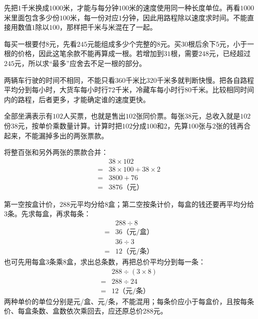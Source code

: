 \documentclass[multi=snippet,border=0pt]{standalone}
\newenvironment{snippet}[3]{\begin{minipage}{#1bp}\color{answerred}\fontsize{#2}{#3}\selectfont\raggedright}{\end{minipage}}
\begin{document}
\begin{snippet}{505}{11.5}{14}先把\(1\)千米换成\(1000\)米，才能与每分钟\(100\)米的速度使用同一种长度单位。再看\(1000\)米里面包含多少份\(100\)米，每一份对应\(1\)分钟，因此用路程除以速度求时间。不能直接用数值\(1\)除以\(100\)，那样把千米与米混在了一起。\end{snippet}
\begin{snippet}{505}{11.5}{14}每买一根要付\(8\)元，先看\(245\)元能组成多少个完整的\(8\)元。买\(30\)根后余下\(5\)元，小于一根的价格，因此这笔余款不能再算成一根。若增加到\(31\)根，需要\(248\)元，已经超过\(245\)元，所以求“最多”应舍去不足一根的部分。\end{snippet}
\begin{snippet}{505}{11.5}{14}两辆车行驶的时间不相同，不能只看\(360\)千米比\(320\)千米多就判断快慢。把各自路程平均分到每小时，大货车每小时行\(72\)千米，冷藏车每小时行\(80\)千米。比较相同时间内的路程，后者更多，才能确定谁的速度更快。\end{snippet}
\begin{snippet}{505}{11.5}{14}全部坐满表示有\(102\)人买票，也就是售出\(102\)张同价票。每张\(38\)元，总收入就是\(102\)份\(38\)元，按单价乘数量计算。计算时把\(102\)分成\(100\)和\(2\)，先算\(100\)张与\(2\)张的钱再合起来，不能漏掉多出的两张票款。\par 将整百张和另外两张的票款合并：\[\begin{aligned}&38\times102\\={}&38\times100+38\times2\\={}&3800+76\\={}&3876\text{（元）}\end{aligned}\]\end{snippet}
\begin{snippet}{505}{11.5}{14}第一空按盒计价，\(288\)元平均分给\(8\)盒；第二空按条计价，每盒的钱还要再平均分给\(3\)条。先求每盒，再求每条：\[\begin{aligned}&288\div8\\={}&36\text{（元/盒）}\end{aligned}\]\[\begin{aligned}&36\div3\\={}&12\text{（元/条）}\end{aligned}\]也可先用每盒\(3\)条乘\(8\)盒，求出总条数，再把总价平均分到每一条：\[\begin{aligned}&288\div(3\times8)\\={}&288\div24\\={}&12\text{（元/条）}\end{aligned}\]两种单价的单位分别是元/盒、元/条，不能混用；每条价应小于每盒价，且按每条价、每盒条数、盒数依次乘回去，应还原总价\(288\)元。\end{snippet}
\end{document}
